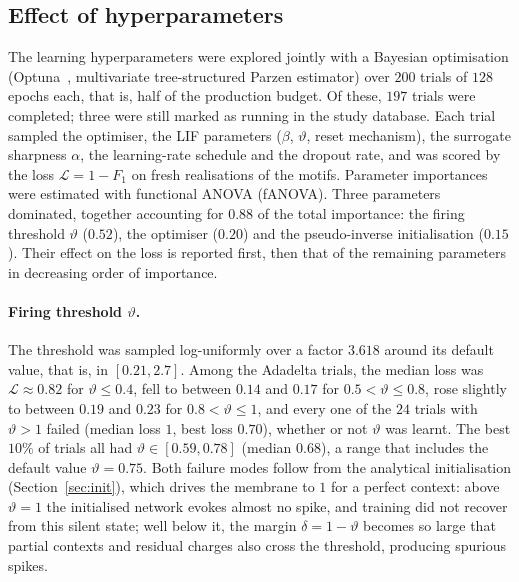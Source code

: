 \documentclass{scrartcl}
\newcommand{\citep}[1]{\parencite{#1}}
\begin{document}
\subsection{Effect of hyperparameters}
\label{sec:hyperparameters}
The learning hyperparameters were explored jointly with a Bayesian optimisation (Optuna~\citep{Akiba2019}, multivariate tree-structured Parzen estimator) over $200$ trials of $128$ epochs each, that is, half of the production budget. Of these, $197$ trials were completed; three were still marked as running in the study database. Each trial sampled the optimiser, the LIF parameters ($\beta$, $\vartheta$, reset mechanism), the surrogate sharpness $\alpha$, the learning-rate schedule and the dropout rate, and was scored by the loss $\mathcal{L} = 1 - F_1$ on fresh realisations of the motifs. Parameter importances were estimated with functional ANOVA (fANOVA). Three parameters dominated, together accounting for $0.88$ of the total importance: the firing threshold $\vartheta$ ($0.52$), the optimiser ($0.20$) and the pseudo-inverse initialisation ($0.15$). Their effect on the loss is reported first, then that of the remaining parameters in decreasing order of importance.

\paragraph{Firing threshold $\vartheta$.}
The threshold was sampled log-uniformly over a factor $3.618$ around its default value, that is, in $[0.21, 2.7]$. Among the Adadelta trials, the median loss was $\mathcal{L} \approx 0.82$ for $\vartheta \le 0.4$, fell to between $0.14$ and $0.17$ for $0.5 < \vartheta \le 0.8$, rose slightly to between $0.19$ and $0.23$ for $0.8 < \vartheta \le 1$, and every one of the $24$ trials with $\vartheta > 1$ failed (median loss $1$, best loss $0.70$), whether or not $\vartheta$ was learnt. The best $10\%$ of trials all had $\vartheta \in [0.59, 0.78]$ (median $0.68$), a range that includes the default value $\vartheta = 0.75$. Both failure modes follow from the analytical initialisation (Section~\ref{sec:init}), which drives the membrane to $1$ for a perfect context: above $\vartheta = 1$ the initialised network evokes almost no spike, and training did not recover from this silent state; well below it, the margin $\delta = 1 - \vartheta$ becomes so large that partial contexts and residual charges also cross the threshold, producing spurious spikes.
\end{document}
